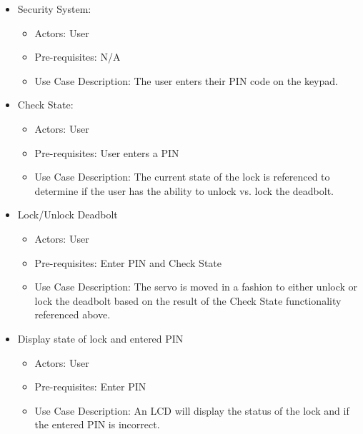 \begin{itemize}
    \item Security System: 
    \begin{itemize}
            \item Actors: User
            \item Pre-requisites: N/A
            \item Use Case Description: The user enters their PIN code on the keypad.
    \end{itemize}

    \item Check State: 
    \begin{itemize}
            \item Actors: User
            \item Pre-requisites: User enters a PIN
            \item Use Case Description: The current state of the lock is referenced to determine if the user has the ability to unlock vs. lock the deadbolt.
    \end{itemize}

    \item Lock/Unlock Deadbolt
    \begin{itemize}
        \item Actors: User
        \item Pre-requisites: Enter PIN and Check State
        \item Use Case Description: The servo is moved in a fashion to either unlock or lock the deadbolt based on the result of the Check State functionality referenced above. 
    \end{itemize}

    \item Display state of lock and entered PIN
    \begin{itemize}
        \item Actors: User
        \item Pre-requisites: Enter PIN
        \item Use Case Description: An LCD will display the status of the lock and if the entered PIN is incorrect. 
    \end{itemize}
    
\end{itemize}

